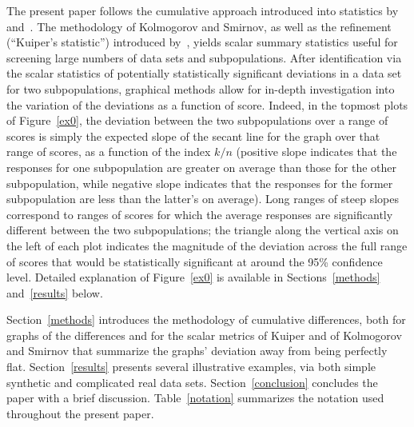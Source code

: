\documentclass{article}
\begin{document}
The present paper follows the cumulative approach introduced into statistics
by~\cite{kolmogorov} and~\cite{smirnov}.
The methodology of Kolmogorov and Smirnov,
as well as the refinement (``Kuiper's statistic'') introduced by~\cite{kuiper},
yields scalar summary statistics useful for screening large numbers
of data sets and subpopulations. After identification via the scalar statistics
of potentially statistically significant deviations in a data set
for two subpopulations, graphical methods allow for in-depth investigation
into the variation of the deviations as a function of score.
Indeed, in the topmost plots of Figure~\ref{ex0},
the deviation between the two subpopulations over a range of scores
is simply the expected slope of the secant line for the graph
over that range of scores, as a function of the index $k/n$
(positive slope indicates that the responses
for one subpopulation are greater on average than those
for the other subpopulation, while negative slope indicates
that the responses for the former subpopulation are less than the latter's
on average).
Long ranges of steep slopes correspond to ranges of scores for which
the average responses are significantly different
between the two subpopulations;
the triangle along the vertical axis on the left of each plot
indicates the magnitude of the deviation across the full range of scores
that would be statistically significant at around the 95\% confidence level.
Detailed explanation of Figure~\ref{ex0} is available
in Sections~\ref{methods} and~\ref{results} below.

Section~\ref{methods} introduces the methodology of cumulative differences,
both for graphs of the differences and for the scalar metrics
of Kuiper and of Kolmogorov and Smirnov that summarize the graphs' deviation
away from being perfectly flat.
Section~\ref{results} presents several illustrative examples,
via both simple synthetic and complicated real data sets.
Section~\ref{conclusion} concludes the paper with a brief discussion.
Table~\ref{notation} summarizes the notation used throughout the present paper.
\end{document}
